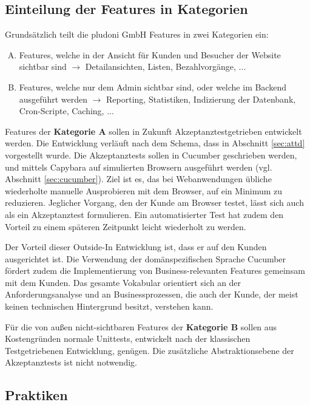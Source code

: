 \subsection{Einteilung der Features in Kategorien}
Grundsätzlich teilt die pludoni GmbH Features in zwei Kategorien ein:

\begin{enumerate}[A.]

 \item Features, welche in der Ansicht für Kunden und Besucher der Website sichtbar sind $\to$ Detailansichten, Listen, Bezahlvorgänge, ...
 \item Features, welche nur dem Admin sichtbar sind, oder welche im Backend ausgeführt werden $\to$ Reporting, Statistiken, Indizierung der Datenbank, Cron-Scripte, Caching, ...
\end{enumerate}

Features der \textbf{Kategorie A} sollen in Zukunft Akzeptanztestgetrieben entwickelt werden. Die Entwicklung verläuft nach dem Schema, dass in Abschnitt \ref{sec:attd} vorgestellt wurde. Die Akzeptanztests sollen in Cucumber geschrieben werden, und mittels Capybara auf simulierten Browsern ausgeführt werden (vgl. Abschnitt \ref{sec:cucumber}).
Ziel ist es, das bei Webanwendungen übliche wiederholte manuelle Ausprobieren mit dem Browser, auf ein Minimum zu reduzieren. Jeglicher Vorgang, den der Kunde am Browser testet, lässt sich auch als ein Akzeptanztest formulieren. Ein automatisierter Test hat zudem den Vorteil zu einem späteren Zeitpunkt leicht wiederholt zu werden.

Der Vorteil dieser Outside-In Entwicklung ist, dass er auf den Kunden ausgerichtet ist. Die Verwendung der domänspezifischen Sprache Cucumber fördert zudem die Implementierung von Business-relevanten Features gemeinsam mit dem Kunden. Das gesamte Vokabular orientiert sich an der Anforderungsanalyse und an Businessprozessen, die auch der Kunde, der meist keinen technischen Hintergrund besitzt, verstehen kann.

Für die von außen nicht-sichtbaren Features der \textbf{Kategorie B} sollen aus Kostengründen normale Unittests, entwickelt nach der klassischen Testgetriebenen Entwicklung, genügen. Die zusätzliche Abstraktionsebene der Akzeptanztests ist nicht notwendig.

\subsection{Praktiken}
\label{sec:auswahlWeitere}

